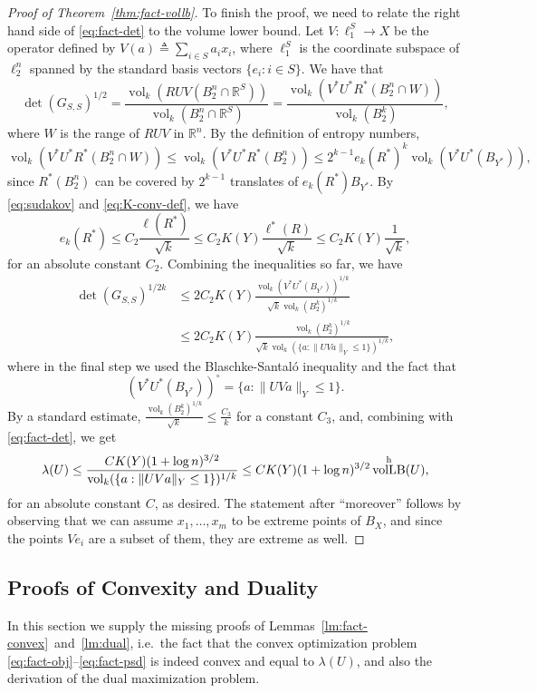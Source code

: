 \documentclass[11pt]{article}
\newcommand{\R}{{\mathbb{R}}}
\newcommand{\eqdef}{\triangleq}
\DeclareMathOperator{\vollb}{volLB}
\DeclareMathOperator{\vol}{vol}
\begin{document}
\begin{proof}[Proof of Theorem~\ref{thm:fact-vollb}]
  To finish the proof, we need to relate the right hand side of
  \eqref{eq:fact-det} to the volume lower bound. Let $V:\ell_1^S \to X$ be
  the operator defined by $V(a) \eqdef \sum_{i \in S}{a_i x_i}$, where
  $\ell_1^S$ is the coordinate subspace of $\ell_2^n$ spanned by the standard
  basis vectors $\{e_i: i \in S\}$. We have that 
  \[
  \det(G_{S,S})^{1/2} 
  = \frac{\vol_k(RUV(B_2^n\cap \R^S))}{\vol_k(B_2^n \cap \R^S)}
  = \frac{\vol_k(V^*U^*R^*(B^n_2\cap W))}{\vol_k(B_2^k)},
  \]
  where $W$ is the range of $RUV$ in $\R^n$. By the definition of
  entropy numbers,
  \[
  \vol_k(V^*U^*R^*(B^n_2\cap W))\le
  \vol_k(V^*U^*R^*(B_2^n))
  \le 2^{k-1}e_k(R^*)^k \vol_k(V^*U^*(B_{Y^*})), 
  \]
  since $R^*(B_2^n)$ can be covered by $2^{k-1}$ translates of
  $e_k(R^*)B_{Y^*}$. By \eqref{eq:sudakov} and \eqref{eq:K-conv-def}, we
  have
  \[
  e_k(R^*) \le C_2 \frac{\ell(R^*)}{\sqrt{k}} 
  \le C_2 K(Y) \frac{\ell^*(R)}{\sqrt{k}}
  \le C_2 K(Y) \frac{1}{\sqrt{k}},
  \]
  for an absolute constant $C_2$. Combining the inequalities so far,
  we have
  \begin{align*}
  \det(G_{S,S})^{1/2k} &\le
  2C_2 K(Y) 
  \frac{\vol_k(V^*U^*(B_{Y^*}))^{1/k}}{\sqrt{k}\vol_k(B_2^k)^{1/k}}\\
  &\le
  2C_2 K(Y)
  \frac{\vol_k(B_2^k)^{1/k}}{\sqrt{k}\vol_k(\{a: \|UVa\|_Y\le 1\})^{1/k}},
  \end{align*}
  where in the final step we used the Blaschke-Santal\'{o} inequality and
  the fact that 
  \[
  (V^*U^*(B_{Y^*}))^\circ = \{a: \|UVa\|_Y\le 1\}.
  \]
  By a standard estimate, $\frac{\vol_k(B_2^k)^{1/k}}{\sqrt{k}} \le
   \frac{C_3}{k}$ for a constant $C_3$, and, combining with \eqref{eq:fact-det}, we get
  \[
  \lambda(U)\le \frac{C K(Y) (1+\log n)^{3/2} }{\vol_k(\{a: \|UVa\|_Y\le 1\})^{1/k}}
  \le C K(Y) (1+\log n)^{3/2} \vollb^{\rm h}(U),
  \]
  for an absolute constant $C$, as desired. The statement after
  ``moreover'' follows by observing that we can assume $x_1, \ldots,
  x_m$ to be extreme points of $B_X$, and since the points $Ve_i$ are
  a subset of them, they are extreme as well.
\end{proof}

\subsection{Proofs of Convexity and Duality}
\label{sect:fact-proofs}

In this section we supply the missing proofs of
Lemmas~\ref{lm:fact-convex}~and~\ref{lm:dual}, i.e.~the fact that the
convex optimization  problem \eqref{eq:fact-obj}--\eqref{eq:fact-psd}
is indeed convex and equal to $\lambda(U)$, and also the derivation of
the dual maximization problem. 
\end{document}
